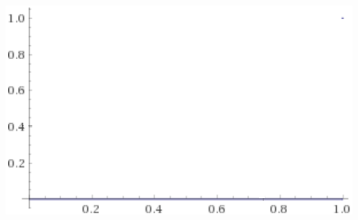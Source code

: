 \documentclass{beamer}
\begin{document}
\begin{frame}
\begin{columns}
\begin{minipage}[c][0.4\textheight][c]{\linewidth}
\end{minipage}
\begin{minipage}[c][0.4\textheight][c]{\linewidth}
  \centering
  \includegraphics[width=0.8\linewidth]{drastDiag}
\end{minipage}
\end{columns}
\end{frame}
\end{document}
